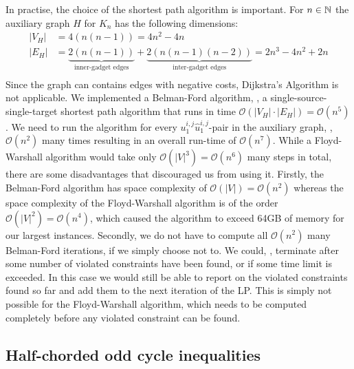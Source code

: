 In practise, the choice of the shortest path algorithm is important.
For $n \in \mathbb{N}$ the auxiliary graph $H$ for $K_{n}$ has the following dimensions:
\begin{align*}
	\lvert V_{H} \rvert &= 4 \left( n(n-1) \right) = 4n^{2} - 4n \\
	\lvert E_{H} \rvert &= \underbrace{2 \left( n(n-1) \right)}_{\text{inner-gadget edges}} + \underbrace{2 \left( n(n-1)(n-2) \right)}_{\text{inter-gadget edges}} = 2n^{3} - 4n^{2} + 2n \\
\end{align*}
Since the graph can contains edges with negative costs, Dijkstra’s Algorithm is not applicable.
We implemented a Belman-Ford algorithm, \ie, a single-source-single-target shortest path algorithm that runs in time $\mathcal{O}(\lvert V_{H} \rvert \cdot \lvert E_{H} \rvert) = \mathcal{O}(n^{5})$.
We need to run the algorithm for every $u_{1}^{i,j}\hat{u}_{1}^{i,j}$-pair in the auxiliary graph, \ie, $\mathcal{O}(n^{2})$ many times resulting in an overall run-time of $\mathcal{O}(n^{7})$.
While a Floyd-Warshall algorithm would take only $\mathcal{O}(\lvert V \rvert^3) = \mathcal{O}(n^{6})$ many steps in total, there are some disadvantages that discouraged us from using it.
Firstly, the Belman-Ford algorithm has space complexity of $\mathcal{O}(\lvert V \rvert) = \mathcal{O}(n^{2})$ whereas the space complexity of the Floyd-Warshall algorithm is of the order $\mathcal{O}(\lvert V \rvert^{2}) = \mathcal{O}(n^{4})$, which caused the algorithm to exceed 64GB of memory for our largest instances.
Secondly, we do not have to compute all $\mathcal{O}(n^{2})$ many Belman-Ford iterations, if we simply choose not to.
We could, \eg, terminate after some number of violated constraints have been found, or if some time limit is exceeded.
In this case we would still be able to report on the violated constraints found so far and add them to the next iteration of the LP.
This is simply not possible for the Floyd-Warshall algorithm, which needs to be computed completely before any violated constraint can be found.


\subsection{Half-chorded odd cycle inequalities}\label{subsec:half_chorded_separator}

